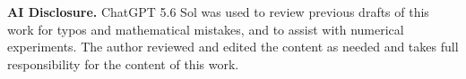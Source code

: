 \documentclass[11pt]{article}
\theoremstyle{plain}
\numberwithin{equation}{section}
\theoremstyle{definition}
\begin{document}
    \medskip

    \noindent\textbf{AI Disclosure.}
    ChatGPT 5.6 Sol was used to review previous drafts of this
    work for typos and mathematical mistakes, and to assist with numerical experiments. The author reviewed and edited the content as needed and takes full responsibility for the content of this work.
    

    
	\let\oldthebibliography\thebibliography
	\let\endoldthebibliography\endthebibliography
	\renewenvironment{thebibliography}[1]{
	\begin{oldthebibliography}{#1}
	\setlength{\itemsep}{0.5pt}
	\setlength{\parskip}{0.5pt}
	}
	{
	\end{oldthebibliography}
	}
	
	{\small
	
	}
\end{document}
